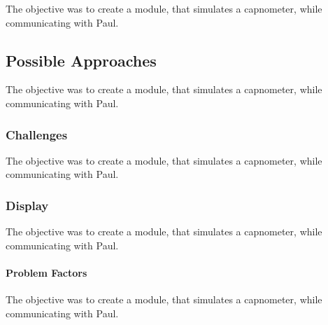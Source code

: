 \documentclass[12pt]{article}
\begin{document}
The objective was to create a module, that simulates a capnometer, while communicating
with Paul.


\subsection{Possible Approaches}

The objective was to create a module, that simulates a capnometer, while communicating
with Paul.


\subsubsection{Challenges}

The objective was to create a module, that simulates a capnometer, while communicating
with Paul.


\subsubsection{Display}

The objective was to create a module, that simulates a capnometer, while communicating
with Paul.


\paragraph{Problem Factors}

The objective was to create a module, that simulates a capnometer, while communicating
with Paul.

\end{document}
